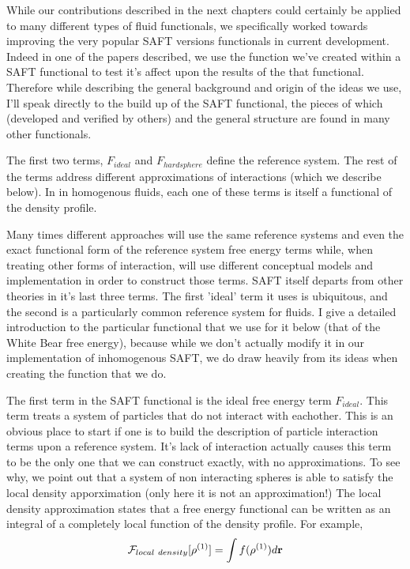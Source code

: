 While our contributions described in the next chapters could certainly
be applied to many different types of fluid functionals, we
specifically worked towards improving the very popular SAFT versions
functionals in current development.  Indeed in one of the papers
described, we use the function we've created within a SAFT functional
to test it's affect upon the results of the that functional.
Therefore while describing the general background and origin of the
ideas we use, I'll speak directly to the build up of the SAFT
functional, the pieces of which (developed and verified by others) and
the general structure are found in many other functionals.


The first two terms, $F_{ideal}$ and $F_{hard sphere}$
define the reference system.  The rest of the terms address different
approximations of interactions (which we describe below).  In in
homogenous fluids, each one of these terms is itself a functional of
the density profile.

Many times different approaches will use the same reference systems
and even the exact functional form of the reference system free energy
terms while, when treating other forms of interaction, will use
different conceptual models and implementation in order to construct
those terms.  SAFT itself departs from other theories in it's last
three terms.  The first 'ideal' term it uses is ubiquitous, and the
second is a particularly common reference system for fluids.  I give a
detailed introduction to the particular functional that we use for it
below (that of the White Bear free energy), because while we don't
actually modify it in our implementation of inhomogenous SAFT, we do
draw heavily from its ideas when creating the function that we do.

The first term in the SAFT functional is the ideal free energy term
$F_{ideal}$.  This term treats a system of particles that do not
interact with eachother.  This is an obvious place to start if one is
to build the description of particle interaction terms upon a
reference system.  It's lack of interaction actually causes this term
to be the only one that we can construct exactly, with no
approximations.  To see why, we point out that a system of non
interacting spheres is able to satisfy the local density apporximation
(only here it is not an approximation!)  The local density
approximation states that a free energy functional can be written as
an integral of a completely local function of the density profile.
For example,
\begin{align}
  \mathcal{F}_{local~density}[\rho^{(1)}] = \int f(\rho^{(1)}) d\textbf{r}
\end{align}

